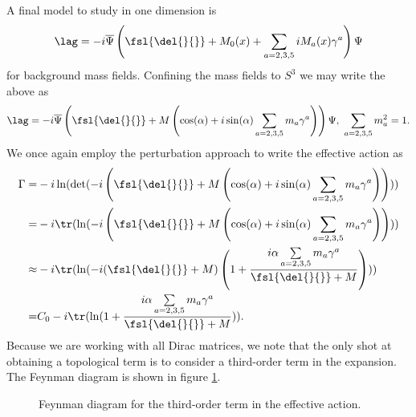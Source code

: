 A final model to study in one dimension is
\begin{align*}
	\lag = -i\overline{\Psi}\left(\fsl{\del{}{}} + M_{0}(x) + \sum\limits_{a = 2, 3, 5}iM_{a}(x)\gamma^{a}\right)\Psi
\end{align*}
for background mass fields. Confining the mass fields to $S^{3}$ we may write the above as
\begin{align*}
	\lag = -i\overline{\Psi}\left(\fsl{\del{}{}} + M\left(\cos(\alpha) + i\sin(\alpha)\sum\limits_{a = 2, 3, 5}m_{a}\gamma^{a}\right)\right)\Psi,\ \sum\limits_{a = 2, 3, 5}m_{a}^{2} = 1.
\end{align*}
We once again employ the perturbation approach to write the effective action as
\begin{align*}
	\Gamma =& -i\ln(\det(-i\left(\fsl{\del{}{}} + M\left(\cos(\alpha) + i\sin(\alpha)\sum\limits_{a = 2, 3, 5}m_{a}\gamma^{a}\right)\right))) \\
	       =& -i\tr(\ln(-i\left(\fsl{\del{}{}} + M\left(\cos(\alpha) + i\sin(\alpha)\sum\limits_{a = 2, 3, 5}m_{a}\gamma^{a}\right)\right))) \\
	 \approx& -i\tr(\ln(-i(\fsl{\del{}{}} + M)\left(1 + \frac{i\alpha\sum\limits_{a = 2, 3, 5}m_{a}\gamma^{a}}{\fsl{\del{}{}} + M}\right))) \\
	       =& C_{0} - i\tr(\ln(1 + \frac{i\alpha\sum\limits_{a = 2, 3, 5}m_{a}\gamma^{a}}{\fsl{\del{}{}} + M})).
\end{align*}
Because we are working with all Dirac matrices, we note that the only shot at obtaining a topological term is to consider a third-order term in the expansion. The Feynman diagram is shown in figure \ref{fig:third_order_fd}.

\begin{figure}[!ht]
	\centering
	\caption{Feynman diagram for the third-order term in the effective action.}
	\label{fig:third_order_fd}
\end{figure}

